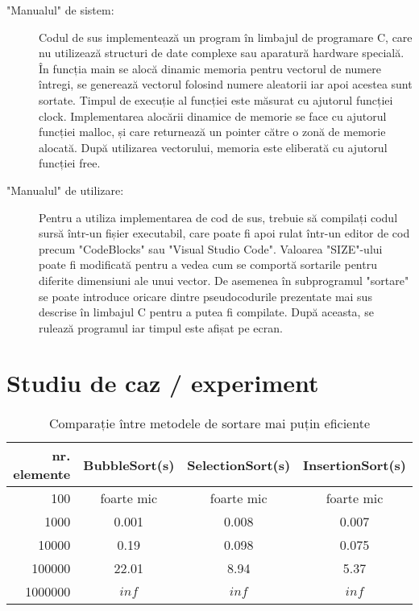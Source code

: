 \documentclass[12pt]{article}
\begin{document}
\begin{description}
    \item ["Manualul" de sistem:]
    Codul de sus implementează un program în limbajul de programare C, care nu utilizează structuri de date complexe sau aparatură hardware specială. În funcția main se alocă dinamic memoria pentru vectorul de numere întregi, se generează vectorul folosind numere aleatorii iar apoi acestea sunt sortate. Timpul de execuție al funcției este măsurat cu ajutorul funcției clock. Implementarea alocării dinamice de memorie se face cu ajutorul funcției  malloc, și care returnează un pointer către o zonă de memorie alocată. După utilizarea vectorului, memoria este eliberată cu ajutorul funcției free.

    \item ["Manualul" de utilizare:]
    Pentru a utiliza implementarea de cod de sus, trebuie să compilați codul sursă într-un fișier executabil, care poate fi apoi rulat într-un editor de cod precum "CodeBlocks" sau "Visual Studio Code". Valoarea "SIZE"-ului poate fi modificată pentru a vedea cum se comportă sortarile pentru diferite dimensiuni ale unui vector. De asemenea în subprogramul "sortare" se poate introduce oricare dintre pseudocodurile prezentate mai sus descrise în limbajul C pentru a putea fi compilate. După aceasta, se rulează programul iar timpul este afișat pe ecran.
\end{description}
\section{Studiu de caz / experiment}
\begin{table}[h!]
\centering
\begin{tabular}{| r | c | c | c |}
\hline
 nr. elemente& BubbleSort(s) & SelectionSort(s) & InsertionSort(s) \\
\hline
100 & foarte mic & foarte mic & foarte mic \\
1000 & 0.001 &  0.008 & 0.007 \\
10000 & 0.19 & 0.098 & 0.075 \\
100000 &  22.01 &  8.94 & 5.37 \\
1000000 & $inf$ & $inf$ & $inf$ \\
\hline
\end{tabular}
\caption{Comparație între metodele de sortare mai puțin eficiente}
\label{tab1}
\end{table}
\end{document}
